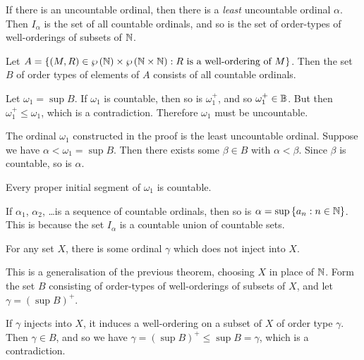 \documentclass{article}
\begin{document}
\begin{prf}
    If there is an uncountable ordinal, then there is a \textit{least} uncountable ordinal $\alpha$. Then $I_\alpha$ is the set of all countable ordinals, and so is the set of order-types of well-orderings of subsets of $\mathbb{N}$.
    
    Let $A = \left\lbrace (M, R) \in \wp\left(\mathbb{N}\right) \times \wp\left(\mathbb{N} \times \mathbb{N}\right) : R \text{ is a well-ordering of } M \right\rbrace$. Then the set $B$ of order types of elements of $A$ consists of all countable ordinals.
    
    Let $\omega_1 = \sup B$. If $\omega_1$ is countable, then so is $\omega_1^+$, and so $\omega_1^+ \in \mathbb{B}$. But then $\omega_1^+ \leq \omega_1$, which is a contradiction. Therefore $\omega_1$ must be uncountable.
\end{prf}

\begin{corollary}
	The ordinal $\omega_1$ constructed in the proof is the least uncountable ordinal. Suppose we have $\alpha < \omega_1 = \sup B$. Then there exists some $\beta \in B$ with $\alpha < \beta$. Since $\beta$ is countable, so is $\alpha$.
\end{corollary}

\begin{corollary}
    Every proper initial segment of $\omega_1$ is countable.
\end{corollary}

\begin{corollary}
    If $\alpha_1$, $\alpha_2$, \dots is a sequence of countable ordinals, then so is $\alpha = \sup \left\lbrace a_n : n \in \mathbb{N} \right\rbrace$. This is because the set $I_\alpha$ is a countable union of countable sets.
\end{corollary}

\begin{theorem}
	\label{hartogs-lemma}
    For any set $X$, there is some ordinal $\gamma$ which does not inject into $X$.
\end{theorem}

\begin{prf}
    This is a generalisation of the previous theorem, choosing $X$ in place of $\mathbb{N}$. Form the set $B$ consisting of order-types of well-orderings of subsets of $X$, and let $\gamma = (\sup B)^+$.
    
    If $\gamma$ injects into $X$, it induces a well-ordering on a subset of $X$ of order type $\gamma$. Then $\gamma \in B$, and so we have $\gamma = (\sup B)^+ \leq \sup B = \gamma$, which is a contradiction.
\end{prf}
\end{document}
